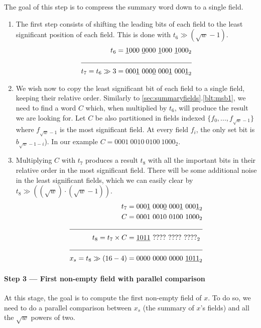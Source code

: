 The goal of this step is to compress the summary word down to a single field.

\begin{enumerate}
    \item \label{blt:summCompression1}
    The first step consists of shifting the leading bits of each field to the least significant position of each field. This is done with $t_6 \gg (\sqrt{w} - 1)$. 
    \begin{align*}
                    t_6 &= \underline{1}000\ \underline{0}000\ \underline{1}000\ \underline{1}000_2 \\ \cline{1-2} 
        t_7 = t_6 \gg 3 &= 000\underline{1}\ 000\underline{0}\ 000\underline{1}\ 000\underline{1}_2
    \end{align*}
    
    \item \label{blt:summCompression2}
    We wish now to copy the least significant bit of each field to a single field, keeping their relative order.
    Similarly to \ref{sec:summaryfields}.\ref{blt:msb1}, we need to find a word $C$ which, when multiplied by $t_6$, will produce the result we are looking for.
    Let $C$ be also partitioned in fields indexed $\{f_0, ..., f_{\sqrt{w} - 1}\}$ where $f_{\sqrt{w} - 1}$ is the most significant field. At every field $f_i$, the only set bit is $b_{\sqrt{w} - 1 - i}$).
    In our example $C = 0001\ 0010\ 0100\ 1000_2$.
    
    \item \label{blt:summCompression3}
    Multiplying $C$ with $t_7$ produces a result $t_8$ with all the important bits in their relative order in the most significant field. There will be some additional noise in the least significant fields, which we can easily clear by $t_8 \gg ((\sqrt{w})\cdot(\sqrt{w} - 1))$.
        \begin{align*}
                         t_7 &= 000\underline{1}\ 000\underline{0}\ 000\underline{1}\ 000\underline{1}_2 \\
                           C &= 0001\ 0010\ 0100\ 1000_2 \\ \cline{1-2} 
          t_8 = t_7 \times C &= \underline{1011}\ ????\ ????\ ????_2\\ \cline{1-2}
        x_s = t_8 \gg (16-4) &= 0000\ 0000\ 0000\ \underline{1011}_2
    \end{align*}
\end{enumerate}

\paragraph{Step 3 --- First non-empty field with parallel comparison} \label{sec:parallel}
At this stage, the goal is to compute the first non-empty field of $x$. To do so, we need to do a parallel comparison between $x_s$ (the summary of $x$'s fields) and all the $\sqrt{w}$ powers of two.

